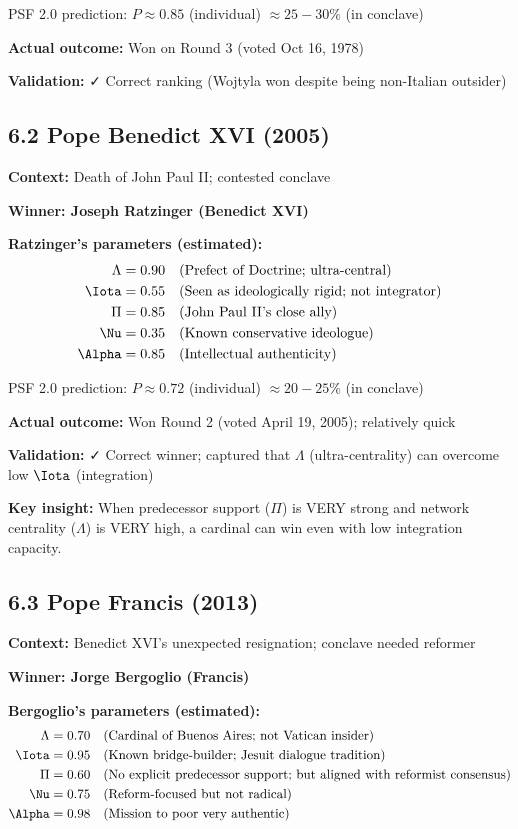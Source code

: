 \documentclass[11pt]{article}
\begin{document}
PSF 2.0 prediction: $P \approx 0.85$ (individual) $\approx 25-30\%$ (in conclave)

\textbf{Actual outcome:} Won on Round 3 (voted Oct 16, 1978)

\textbf{Validation:} ✓ Correct ranking (Wojtyla won despite being non-Italian outsider)

\subsection{6.2 Pope Benedict XVI (2005)}

\textbf{Context:} Death of John Paul II; contested conclave

\textbf{Winner: Joseph Ratzinger (Benedict XVI)}

\textbf{Ratzinger's parameters (estimated):}
\begin{align*}
\Lambda &= 0.90 \quad \text{(Prefect of Doctrine; ultra-central)} \\
\Iota &= 0.55 \quad \text{(Seen as ideologically rigid; not integrator)} \\
\Pi &= 0.85 \quad \text{(John Paul II's close ally)} \\
\Nu &= 0.35 \quad \text{(Known conservative ideologue)} \\
\Alpha &= 0.85 \quad \text{(Intellectual authenticity)}
\end{align*}

PSF 2.0 prediction: $P \approx 0.72$ (individual) $\approx 20-25\%$ (in conclave)

\textbf{Actual outcome:} Won Round 2 (voted April 19, 2005); relatively quick

\textbf{Validation:} ✓ Correct winner; captured that $\Lambda$ (ultra-centrality) can overcome low $\Iota$ (integration)

\textbf{Key insight:} When predecessor support ($\Pi$) is VERY strong and network centrality ($\Lambda$) is VERY high, a cardinal can win even with low integration capacity.

\subsection{6.3 Pope Francis (2013)}

\textbf{Context:} Benedict XVI's unexpected resignation; conclave needed reformer

\textbf{Winner: Jorge Bergoglio (Francis)}

\textbf{Bergoglio's parameters (estimated):}
\begin{align*}
\Lambda &= 0.70 \quad \text{(Cardinal of Buenos Aires; not Vatican insider)} \\
\Iota &= 0.95 \quad \text{(Known bridge-builder; Jesuit dialogue tradition)} \\
\Pi &= 0.60 \quad \text{(No explicit predecessor support; but aligned with reformist consensus)} \\
\Nu &= 0.75 \quad \text{(Reform-focused but not radical)} \\
\Alpha &= 0.98 \quad \text{(Mission to poor very authentic)}
\end{align*}
\end{document}
